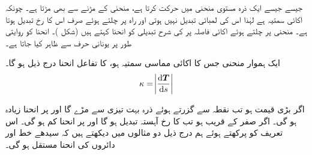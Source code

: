 جیسے جیسے ایک ذرہ مستوی منحنی  میں حرکت کرتا ہے، منحنی کے مڑنے سے   بھی مڑتا ہے۔ چونکہ  اکائی سمتیہ ہے لہٰذا اس کی لمبائی تبدیل نہیں ہوتی  اور راہ پر چلتے ہوئے  صرف اس کا رخ تبدیل ہوتا ہے۔ منحنی پر چلتے ہوئے اکائی فاصلہ پر    کی شرح تبدیلی کو انحنا کہتے ہیں (شکل )۔ انحنا کو روایتی طور پر یونانی حرف   سے ظاہر کیا جاتا ہے۔

 ایک  ہموار منحنی جس  کا اکائی مماسی سمتیہ   ہو، کا تفاعل انحنا درج ذیل ہو گا۔
\begin{align*}
\kappa=\abs{\frac{\dif \kvec{T}}{\dif s}}
\end{align*}

اگر  بڑی قیمت ہو تب نقطہ  سے گزرتے ہوئے ذرہ بہت تیزی سے مڑے گا اور  پر انحنا زیادہ ہو گی۔ اگر  صفر کے قریب ہو تب  کا رخ آہستہ تبدیل ہو گا اور  پر انحنا کم ہو گی۔ اس تعریف کو  پرکھتے ہوئے  ہم درج ذیل دو مثالوں میں دیکھتے ہیں کہ سیدھے خط اور دائروں کی انحنا  مستقل ہو گی۔

